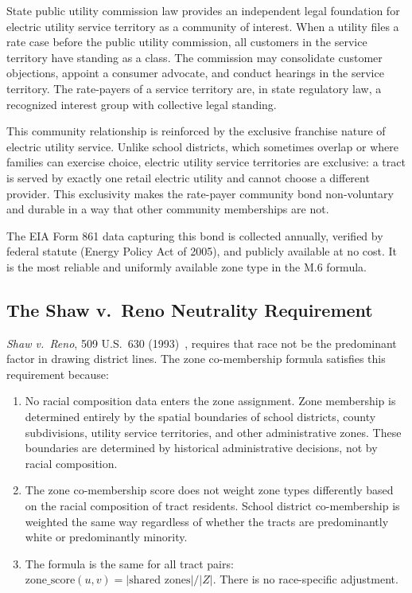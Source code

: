 State public utility commission law provides an independent legal foundation for
electric utility service territory as a community of interest.
When a utility files a rate case before the public utility commission, all customers
in the service territory have standing as a class.
The commission may consolidate customer objections, appoint a consumer advocate,
and conduct hearings in the service territory.
The rate-payers of a service territory are, in state regulatory law, a recognized
interest group with collective legal standing.

This community relationship is reinforced by the exclusive franchise nature of
electric utility service.
Unlike school districts, which sometimes overlap or where families can exercise
choice, electric utility service territories are exclusive: a tract is served by
exactly one retail electric utility and cannot choose a different provider.
This exclusivity makes the rate-payer community bond non-voluntary and durable in
a way that other community memberships are not.

The EIA Form 861 data capturing this bond is collected annually, verified by
federal statute (Energy Policy Act of 2005), and publicly available at no cost.
It is the most reliable and uniformly available zone type in the M.6 formula.

\subsection{The Shaw v.\ Reno Neutrality Requirement}

\textit{Shaw v.\ Reno}, 509 U.S.\ 630 (1993)~\citep{shaw1993}, requires that
race not be the predominant factor in drawing district lines.
The zone co-membership formula satisfies this requirement because:
\begin{enumerate}
  \item No racial composition data enters the zone assignment.
    Zone membership is determined entirely by the spatial boundaries of school
    districts, county subdivisions, utility service territories, and other
    administrative zones.
    These boundaries are determined by historical administrative decisions,
    not by racial composition.
  \item The zone co-membership score does not weight zone types differently based
    on the racial composition of tract residents.
    School district co-membership is weighted the same way regardless of whether
    the tracts are predominantly white or predominantly minority.
  \item The formula is the same for all tract pairs: $\mathrm{zone\_score}(u,v) =
    |\text{shared zones}| / |Z|$.
    There is no race-specific adjustment.
\end{enumerate}

